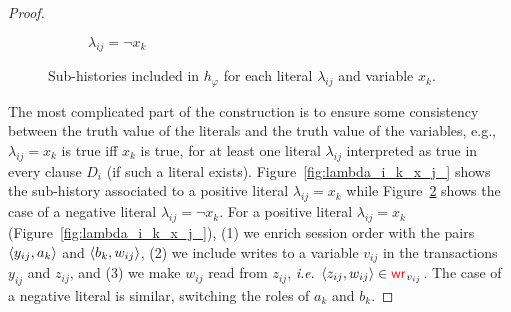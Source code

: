 \begin{proof}
\begin{figure}[t]
{\begin{subfigure}{.55\textwidth}
   \caption{$\lambda_{ij} = \neg x_k$}
   \label{fig:lambda_i_k_n_x_j_}
  \end{subfigure}
 }
  \vspace{-2mm}
 \caption{Sub-histories included in $h_\varphi$ for each literal $\lambda_{ij}$ and variable $x_k$.}
 \vspace{-3mm}
\end{figure}

The most complicated part of the construction is to ensure some consistency between the truth value of the literals and the truth value of the variables, e.g., $\lambda_{ij} = x_k$ is true iff $x_k$ is true, for at least one literal $\lambda_{ij}$ interpreted as true in every clause $D_i$ (if such a literal exists).
Figure~\ref{fig:lambda_i_k_x_j_} shows the sub-history associated to a positive literal $\lambda_{ij} = x_k$ while Figure~\ref{fig:lambda_i_k_n_x_j_} shows the case of a negative literal $\lambda_{ij} = \neg x_k$.
For a positive literal $\lambda_{ij} = x_k$ (Figure~\ref{fig:lambda_i_k_x_j_}), (1) we enrich session order with the pairs ${\left\langle{y_{ij}, a_k}\right\rangle}$ and ${\left\langle{b_k, w_{ij}}\right\rangle}$, (2) we include writes to a variable $v_{ij}$ in the transactions $y_{ij}$ and $z_{ij}$, and (3) we make $w_{ij}$ read from $z_{ij}$, $\textit{i.e.}$ ${\left\langle{z_{ij}, w_{ij}}\right\rangle}\in \textcolor{red}{\mathsf{wr}_{}}_{v_{ij}}$. The case of a negative literal is similar, switching the roles of $a_k$ and $b_k$.


\end{proof}
